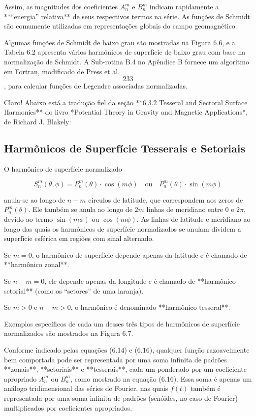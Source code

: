 Assim, as magnitudes dos coeficientes $A_{n}^{m}$ e $B_{n}^{m}$ indicam rapidamente a **“energia” relativa** de seus respectivos termos na série. As funções de Schmidt são comumente utilizadas em representações globais do campo geomagnético.

Algumas funções de Schmidt de baixo grau são mostradas na Figura 6.6, e a Tabela 6.2 apresenta vários harmônicos de superfície de baixo grau com base na normalização de Schmidt. A Sub-rotina B.4 no Apêndice B fornece um algoritmo em Fortran, modificado de Press et al. \[233\], para calcular funções de Legendre associadas normalizadas.


Claro! Abaixo está a tradução fiel da seção **6.3.2 Tesseral and Sectoral Surface Harmonics** do livro *Potential Theory in Gravity and Magnetic Applications*, de Richard J. Blakely:

\subsection{Harmônicos de Superfície Tesserais e Setoriais}


O harmônico de superfície normalizado

$$
S_{n}^{m}(\theta, \phi) = P_{n}^{m}(\theta) \cdot \cos(m\phi) \quad \text{ou} \quad P_{n}^{m}(\theta) \cdot \sin(m\phi)
$$

anula-se ao longo de $n - m$ círculos de latitude, que correspondem aos zeros de $P_{n}^{m}(\theta)$. Ele também se anula ao longo de $2m$ linhas de meridiano entre $0$ e $2\pi$, devido ao termo $\sin(m\phi)$ ou $\cos(m\phi)$. As linhas de latitude e meridiano ao longo das quais os harmônicos de superfície normalizados se anulam dividem a superfície esférica em regiões com sinal alternado.

Se $m = 0$, o harmônico de superfície depende apenas da latitude e é chamado de **harmônico zonal**.

Se $n - m = 0$, ele depende apenas da longitude e é chamado de **harmônico setorial** (como os “setores” de uma laranja).

Se $m > 0$ e $n - m > 0$, o harmônico é denominado **harmônico tesseral**.

Exemplos específicos de cada um desses três tipos de harmônicos de superfície normalizados são mostrados na Figura 6.7.

Conforme indicado pelas equações (6.14) e (6.16), qualquer função razoavelmente bem comportada pode ser representada por uma soma infinita de padrões **zonais**, **setoriais** e **tesserais**, cada um ponderado por um coeficiente apropriado $A_{n}^{m}$ ou $B_{n}^{m}$, como mostrado na equação (6.16). Essa soma é apenas um análogo tridimensional das séries de Fourier, nas quais $f(t)$ também é representada por uma soma infinita de padrões (senóides, no caso de Fourier) multiplicados por coeficientes apropriados.


